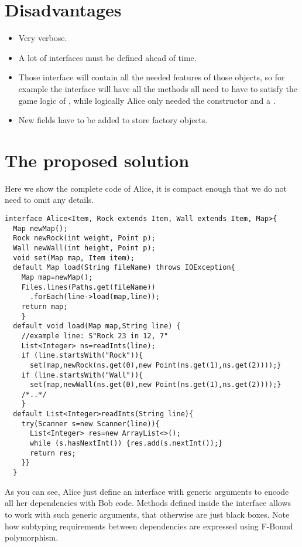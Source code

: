 \documentclass[submission,copyright,creativecommons]{eptcs}
\begin{document}
\section{Disadvantages}
\begin{itemize}
\item Very verbose.
\item A lot of interfaces must be defined ahead of time.
\item Those interface will contain all the needed features of those objects,
so for example the \Q@Rock@ interface will have all the methods all \Q@Item@s need
to have to satisfy the game logic of \Q@Bob@, while logically Alice only needed the constructor
and a \Q@toString@.
\item New fields have to be added to store factory objects.
\end{itemize}


\section{The proposed solution}

Here we show the complete code of Alice, it is compact enough that we do
not need to omit any details.

\begin{lstlisting}
interface Alice<Item, Rock extends Item, Wall extends Item, Map>{
  Map newMap();
  Rock newRock(int weight, Point p);
  Wall newWall(int height, Point p);
  void set(Map map, Item item);
  default Map load(String fileName) throws IOException{
    Map map=newMap();
    Files.lines(Paths.get(fileName))
      .forEach(line->load(map,line));
    return map;
    }
  default void load(Map map,String line) {
    //example line: S"Rock 23 in 12, 7"
    List<Integer> ns=readInts(line);
    if (line.startsWith("Rock")){
      set(map,newRock(ns.get(0),new Point(ns.get(1),ns.get(2))));}
    if (line.startsWith("Wall")){
      set(map,newWall(ns.get(0),new Point(ns.get(1),ns.get(2))));}
    /*..*/
    }
  default List<Integer>readInts(String line){
    try(Scanner s=new Scanner(line)){
      List<Integer> res=new ArrayList<>();
      while (s.hasNextInt()) {res.add(s.nextInt());}
      return res;
    }}
  }
\end{lstlisting}
As you can see, Alice just define an interface with generic arguments
to encode all her dependencies with Bob code.
Methods defined inside the \Q@Alice@ interface allows to work with such 
generic arguments, that otherwise are just black boxes.
Note how subtyping requirements between dependencies are expressed
using F-Bound polymorphism.
\end{document}
